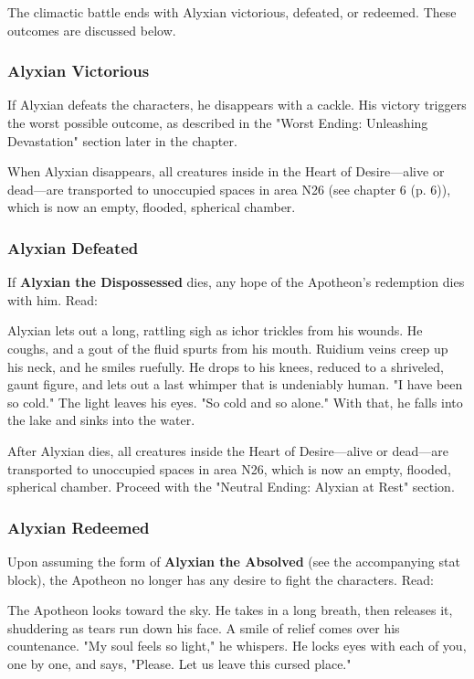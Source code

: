 \documentclass[letterpaper, 11pt, bg=full, twocolumn]{dndbook}
\begin{document}
The climactic battle ends with Alyxian victorious, defeated, or redeemed. These outcomes are discussed below.

\subsubsection{Alyxian Victorious}

If Alyxian defeats the characters, he disappears with a cackle. His victory triggers the worst possible outcome, as described in the "Worst Ending: Unleashing Devastation" section later in the chapter.

When Alyxian disappears, all creatures inside in the Heart of Desire---alive or dead---are transported to unoccupied spaces in area N26 (see chapter 6 (p. 6)), which is now an empty, flooded, spherical chamber.

\subsubsection{Alyxian Defeated}

If \textbf{Alyxian the Dispossessed} dies, any hope of the Apotheon's redemption dies with him. Read:

\begin{DndReadAloud}
Alyxian lets out a long, rattling sigh as ichor trickles from his wounds. He coughs, and a gout of the fluid spurts from his mouth. Ruidium veins creep up his neck, and he smiles ruefully. He drops to his knees, reduced to a shriveled, gaunt figure, and lets out a last whimper that is undeniably human.
"I have been so cold." The light leaves his eyes. "So cold and so alone." With that, he falls into the lake and sinks into the water.
\end{DndReadAloud}

After Alyxian dies, all creatures inside the Heart of Desire---alive or dead---are transported to unoccupied spaces in area N26, which is now an empty, flooded, spherical chamber. Proceed with the "Neutral Ending: Alyxian at Rest" section.

\subsubsection{Alyxian Redeemed}

Upon assuming the form of \textbf{Alyxian the Absolved} (see the accompanying stat block), the Apotheon no longer has any desire to fight the characters. Read:

\begin{DndReadAloud}
The Apotheon looks toward the sky. He takes in a long breath, then releases it, shuddering as tears run down his face. A smile of relief comes over his countenance.
"My soul feels so light," he whispers. He locks eyes with each of you, one by one, and says, "Please. Let us leave this cursed place."
\end{DndReadAloud}
\end{document}
